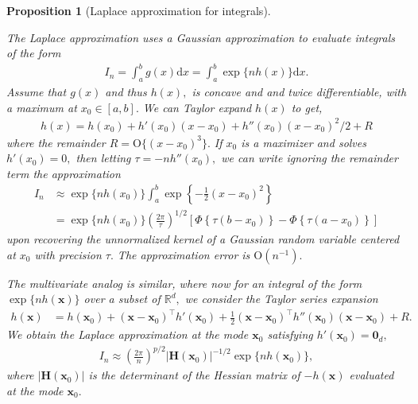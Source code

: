\documentclass[
  11pt,
  letterpaper,
]{scrbook}
\theoremstyle{definition}
\theoremstyle{definition}
\theoremstyle{definition}
\theoremstyle{plain}
\newtheorem{proposition}{Proposition}[chapter]
\theoremstyle{plain}
\theoremstyle{plain}
\theoremstyle{remark}
\begin{document}
\begin{proposition}[Laplace approximation for
integrals]\protect\hypertarget{prp-Laplace-approximation}{}\label{prp-Laplace-approximation}

The Laplace approximation uses a Gaussian approximation to evaluate
integrals of the form \begin{align*}
I_n= \int_a^b g(x) \mathrm{d} x =\int_a^b  \exp\{nh(x)\}\mathrm{d} x.
\end{align*} Assume that \(g(x)\) and thus \(h(x),\) is concave and and
twice differentiable, with a maximum at \(x_0 \in [a,b].\) We can Taylor
expand \(h(x)\) to get, \begin{align*}
h(x) = h(x_0) + h'(x_0)(x-x_0) + h''(x_0)(x-x_0)^2/2 + R
\end{align*} where the remainder \(R=\mathrm{O}\{(x-x_0)^3\}.\) If
\(x_0\) is a maximizer and solves \(h'(x_0)=0,\) then letting
\(\tau=-nh''(x_0),\) we can write ignoring the remainder term the
approximation \begin{align*}
 I_n &\approx \exp\{nh(x_0)\} \int_{a}^b \exp \left\{-\frac{1}{2}(x-x_0)^2\right\}
  \\&= \exp\{nh(x_0)\} \left(\frac{2\pi}{\tau}\right)^{1/2} \left[\Phi\left\{ \tau(b-x_0)\right\} - \Phi\left\{\tau(a-x_0)\right\}\right]
\end{align*} upon recovering the unnormalized kernel of a Gaussian
random variable centered at \(x_0\) with precision \(\tau.\) The
approximation error is \(\mathrm{O}(n^{-1}).\)

The multivariate analog is similar, where now for an integral of the
form \(\exp\{nh(\boldsymbol{x})\}\) over a subset of \(\mathbb{R}^d,\)
we consider the Taylor series expansion \begin{align*}
 h(\boldsymbol{x}) &= h(\boldsymbol{x}_0) + (\boldsymbol{x}- \boldsymbol{x}_0)^\top h'(\boldsymbol{x}_0) + \frac{1}{2}(\boldsymbol{x}- \boldsymbol{x}_0)^\top h''(\boldsymbol{x}_0)(\boldsymbol{x}- \boldsymbol{x}_0) + R.
\end{align*} We obtain the Laplace approximation at the mode
\(\boldsymbol{x}_0\) satisfying
\(h'(\boldsymbol{x}_0)=\boldsymbol{0}_d,\) \begin{align*}
 I_n \approx \left(\frac{2\pi}{n}\right)^{p/2} | \mathbf{H}(\boldsymbol{x}_0)|^{-1/2}\exp\{nh(\boldsymbol{x}_0)\},
\end{align*} where \(|\mathbf{H}(\boldsymbol{x}_0)|\) is the determinant
of the Hessian matrix of \(-h(\boldsymbol{x})\) evaluated at the mode
\(\boldsymbol{x}_0.\)

\end{proposition}
\end{document}
